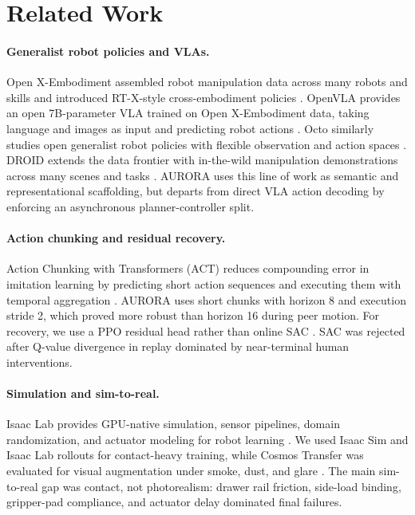 \documentclass[10pt,twocolumn]{article}
\begin{document}
\section{Related Work}

\paragraph{Generalist robot policies and VLAs.}
Open X-Embodiment assembled robot manipulation data across many robots and skills and introduced RT-X-style cross-embodiment policies \citep{openx2023rtx}. OpenVLA provides an open 7B-parameter VLA trained on Open X-Embodiment data, taking language and images as input and predicting robot actions \citep{kim2024openvla}. Octo similarly studies open generalist robot policies with flexible observation and action spaces \citep{octo2024}. DROID extends the data frontier with in-the-wild manipulation demonstrations across many scenes and tasks \citep{droid2024}. AURORA uses this line of work as semantic and representational scaffolding, but departs from direct VLA action decoding by enforcing an asynchronous planner-controller split.

\paragraph{Action chunking and residual recovery.}
Action Chunking with Transformers (ACT) reduces compounding error in imitation learning by predicting short action sequences and executing them with temporal aggregation \citep{zhao2023act}. AURORA uses short chunks with horizon 8 and execution stride 2, which proved more robust than horizon 16 during peer motion. For recovery, we use a PPO residual head rather than online SAC \citep{haarnoja2018sac}. SAC was rejected after Q-value divergence in replay dominated by near-terminal human interventions.

\paragraph{Simulation and sim-to-real.}
Isaac Lab provides GPU-native simulation, sensor pipelines, domain randomization, and actuator modeling for robot learning \citep{isaaclab2025}. We used Isaac Sim and Isaac Lab rollouts for contact-heavy training, while Cosmos Transfer was evaluated for visual augmentation under smoke, dust, and glare \citep{nvidiacosmos2026}. The main sim-to-real gap was contact, not photorealism: drawer rail friction, side-load binding, gripper-pad compliance, and actuator delay dominated final failures.
\end{document}
